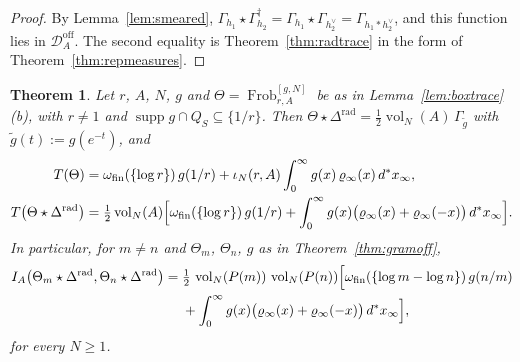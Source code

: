 \documentclass[11pt]{amsart}
\newtheorem{theorem}{Theorem}[section]
\theoremstyle{definition}
\newcommand{\Frob}{\operatorname{Frob}}
\newcommand{\supp}{\operatorname{supp}}
\newcommand{\vol}{\operatorname{vol}}
\newcommand{\Doff}{\mathcal D_A^{\mathrm{off}}}
\begin{document}
\begin{proof}
By Lemma~\ref{lem:smeared},
$\Gamma_{h_1}\star\Gamma_{h_2}^\dagger=\Gamma_{h_1}\star\Gamma_{h_2^\vee}
=\Gamma_{h_1*h_2^\vee}$, and this function lies in $\Doff$. The second
equality is Theorem~\ref{thm:radtrace} in the form of
Theorem~\ref{thm:repmeasures}.
\end{proof}

\begin{theorem}\label{thm:twohalves}
Let $r$, $A$, $N$, $g$ and $\Theta=\Frob_{r,A}^{[g,N]}$ be as in
Lemma~\ref{lem:boxtrace}(b), with $r\ne1$ and
$\supp g\cap Q_S\subseteq\{1/r\}$. Then
$\Theta\star\Delta^{\mathrm{rad}}=\tfrac12\vol_N(A)\,\Gamma_{\tilde g}$ with
$\tilde g(t):=g(e^{-t})$, and
\begin{align}
  T(\Theta)&=\omega_{\mathrm{fin}}(\{\log r\})\,g(1/r)
   +\iota_N(r,A)\int_0^\infty g(x)\,\varrho_\infty(x)\,d^*x_\infty,
   \label{eq:halfA}\\
  T\bigl(\Theta\star\Delta^{\mathrm{rad}}\bigr)&=\tfrac12\vol_N(A)\Bigl[
   \omega_{\mathrm{fin}}(\{\log r\})\,g(1/r)
   +\int_0^\infty g(x)\bigl(\varrho_\infty(x)+\varrho_\infty(-x)\bigr)\,
     d^*x_\infty\Bigr].\label{eq:halfB}
\end{align}
In particular, for $m\ne n$ and $\Theta_m$, $\Theta_n$, $g$ as in
Theorem~\ref{thm:gramoff},
\begin{equation}\label{eq:radgramentry}
\begin{aligned}
  I_A\bigl(\Theta_m\star\Delta^{\mathrm{rad}},
    \Theta_n\star\Delta^{\mathrm{rad}}\bigr)
  ={}&\tfrac12\,\vol_N(P(m))\,\vol_N(P(n))\Bigl[
   \omega_{\mathrm{fin}}(\{\log m-\log n\})\,g(n/m)\\
  &+\int_0^\infty g(x)\bigl(\varrho_\infty(x)+\varrho_\infty(-x)\bigr)\,
     d^*x_\infty\Bigr],
\end{aligned}
\end{equation}
for every $N\ge1$.
\end{theorem}
\end{document}
